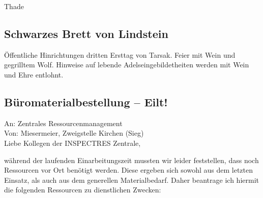 \documentclass[final]{multiversum}
\begin{document}
Thade


\DeclareRobustCommand{\sxout}[1]{\texorpdfstring{\xout{#1}}{#1}}
\subsection{Schwarzes Brett von  Lindstein}
Öffentliche Hinrichtungen dritten Ersttag von Tarsak. Feier mit Wein und gegrilltem Wolf.
Hinweise auf lebende Adelseingebildetheiten werden mit Wein und Ehre entlohnt.


\subsection{Büromaterialbestellung -- Eilt!}
An: Zentrales Ressourcenmanagement \\
Von: Miesermeier, Zweigstelle Kirchen (Sieg) \\

\noindent
Liebe Kollegen der INSPECTRES Zentrale,

während der laufenden Einarbeitungszeit mussten wir leider feststellen, dass noch Ressourcen vor Ort benötigt werden.
Diese ergeben sich sowohl aus dem letzten Einsatz, als auch aus dem generellen Materialbedarf.
Daher beantrage ich hiermit die folgenden Ressourcen zu dienstlichen Zwecken:
\end{document}

